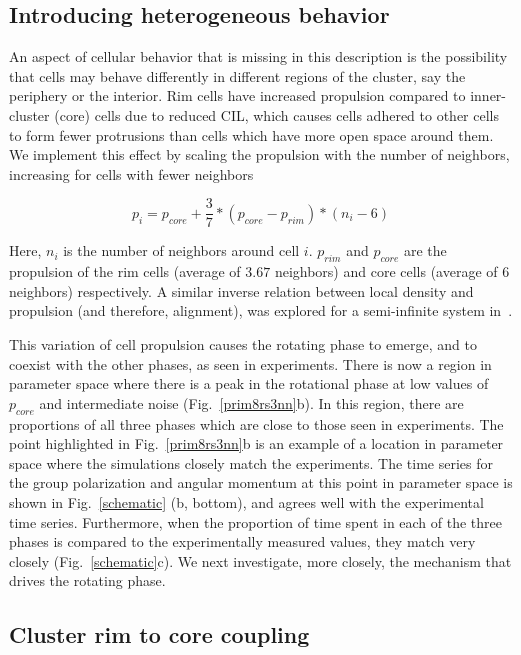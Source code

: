 \documentclass{article}
\begin{document}
\subsection*{Introducing heterogeneous behavior}
An aspect of cellular behavior that is missing in this description is the possibility that cells may behave differently in different regions of the cluster, say the periphery or the interior.  Rim cells have increased propulsion compared to inner-cluster (core) cells due to reduced CIL, which causes cells adhered to other cells to form fewer protrusions than cells which have more open space around them. We implement this effect by scaling the propulsion with the number of neighbors, increasing for cells with fewer neighbors

\begin{equation}
p_i=p_{core}+\frac{3}{7}*(p_{core}-p_{rim})*(n_i-6)
\label{propmag}
\end{equation}

Here, $n_i$ is the number of neighbors around cell $i$.  $p_{rim}$ and $p_{core}$ are the propulsion of the rim cells (average of $3.67$ neighbors) and core cells (average of $6$ neighbors) respectively. A similar inverse relation between local density and propulsion (and therefore, alignment), was explored for a semi-infinite system in~\cite{Mishra2012}.

This variation of cell propulsion causes the rotating phase to emerge, and to coexist with the other phases, as seen in experiments.  There is now a region in parameter space where there is a peak in the rotational phase at low values of $p_{core}$ and intermediate noise (Fig.~\ref{prim8rs3nn}b).  In this region, there are proportions of all three phases which are close to those seen in experiments.  The point highlighted in Fig.~\ref{prim8rs3nn}b is an example of a location in parameter space where the simulations closely match the experiments. The time series for the group polarization and angular momentum at this point in parameter space is shown in Fig.~\ref{schematic} (b, bottom), and agrees well with the experimental time series.  Furthermore, when the proportion of time spent in each of the three phases is compared to the experimentally measured values, they match very closely (Fig.~\ref{schematic}c). We next investigate, more closely, the mechanism that drives the rotating phase.

\subsection*{Cluster rim to core coupling}
\end{document}
